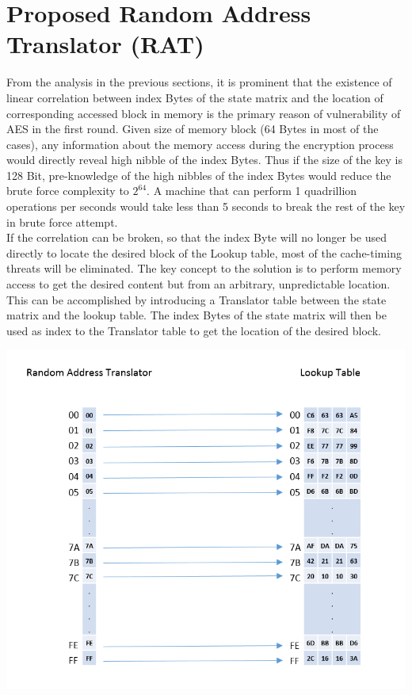 \documentclass[3p]{elsarticle}
\begin{document}
\section{Proposed Random Address Translator (RAT)}

From the analysis in the previous sections, it is prominent that the existence of linear correlation between index Bytes of the state matrix and the location of corresponding accessed block in memory is the primary reason of vulnerability of AES in the first round. Given size of memory block (64 Bytes in most of the cases), any information about the memory access during the encryption process would directly reveal high nibble of the index Bytes. Thus if the size of the key is 128 Bit, pre-knowledge of the high nibbles of the index Bytes would reduce the brute force complexity to $2^{64}$. A machine that can perform 1 quadrillion operations per seconds would take less than 5 seconds to break the rest of the key in brute force attempt.\\

If the correlation can be broken, so that the index Byte will no longer be used directly to locate the desired block of the Lookup table, most of the cache-timing threats will be eliminated. The key concept to the solution is to perform memory access to get the desired content but from an arbitrary, unpredictable location. This can be accomplished by introducing a Translator table between the state matrix and the lookup table. The index Bytes of the state matrix will then be used as index to the Translator table to get the location of the desired block.

\begin{center}
\includegraphics[scale=0.4,natwidth=785,natheight=666]{Figures/rat-init(new).png}
\label{fig: Random Address Translator Initialization.}
\end{center}
\end{document}
